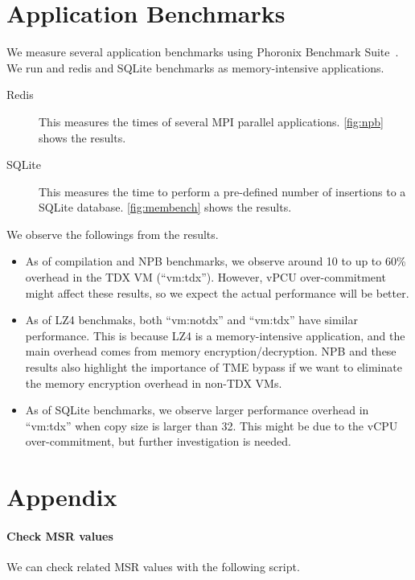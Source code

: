 \documentclass[letterpaper,twocolumn,10pt]{article}
\newcommand{\myparagraph}{\paragraph}
\begin{document}
\section{Application Benchmarks}
\label{sec:app:benchmark}

We measure several application benchmarks using Phoronix Benchmark Suite~\cite{phoronix}.
We run and redis and SQLite benchmarks as memory-intensive applications.

\begin{description}
\item[Redis~\cite{sqlite_bench}] This measures the times of several MPI parallel applications. \autoref{fig:npb} shows the results.
\item[SQLite~\cite{sqlite_bench}] This measures the time to perform a pre-defined number of insertions to a SQLite database. \autoref{fig:membench} shows the results.
\end{description}



We observe the followings from the results.
\begin{itemize}
    \item As of compilation and NPB benchmarks, we observe around 10 to up to 60\% overhead in the TDX VM (``vm:tdx''). However, vPCU over-commitment might affect these results, so we expect the actual performance will be better.
    \item As of LZ4 benchmaks, both ``vm:notdx'' and ``vm:tdx'' have similar performance. This is because LZ4 is a memory-intensive application, and the main overhead comes from memory encryption/decryption. NPB and these results also highlight the importance of TME bypass if we want to eliminate the memory encryption overhead in non-TDX VMs.
    \item As of SQLite benchmarks, we observe larger performance overhead in ``vm:tdx'' when copy size is larger than 32. This might be due to the vCPU over-commitment, but further investigation is needed.
\end{itemize}


\printbibliography

\section*{Appendix}

\myparagraph{Check MSR values}
We can check related MSR values with the following script.

\end{document}
